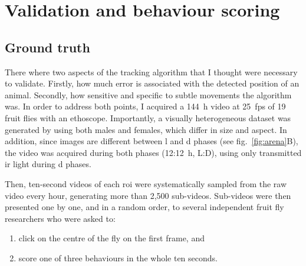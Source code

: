 

\section{Validation and behaviour scoring}
\label{sec:validation}

\subsection{Ground truth}
There where two aspects of the tracking algorithm that I thought were necessary to validate. 
Firstly, how much error is associated with the detected position of an animal.
Secondly, how sensitive and specific to subtle movements the algorithm was.
In order to address both points, I acquired a 144~h video at 25~\acrshort{fps} of 19 fruit flies with an ethoscope.
Importantly, a visually heterogeneous dataset was generated by using both males and females, which differ in size and aspect.
In addition, since images are different between \gls{l} and \gls{d} phases (see fig.~\ref{fig:arena}B), the video was acquired during both phases (12:12~h, L:D), using only transmitted \gls{ir} light during \gls{d} phases.

Then, ten-second videos of each \gls{roi} were systematically sampled from the raw video every hour, generating more than 2,500 sub-videos.
Sub-videos were then presented one by one, and in a random order, to several independent fruit fly researchers who were asked to:

\begin{enumerate}
	\item click on the centre of the fly on the first frame, and 
	\item score one of three behaviours in the whole ten seconds.
\end{enumerate}

